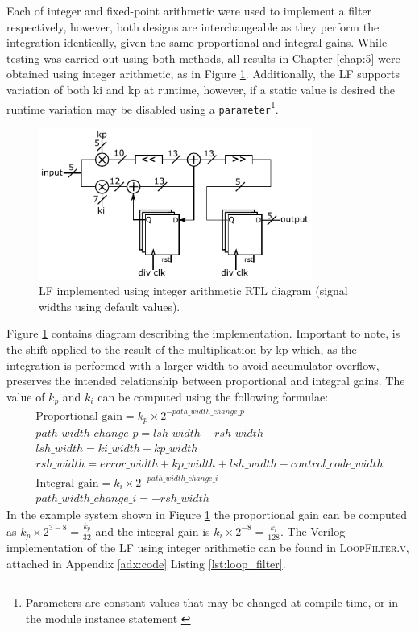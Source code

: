 Each of integer and fixed-point arithmetic were used to implement a filter respectively, however, both designs are interchangeable as they perform the integration identically, given the same proportional and integral gains. While testing was carried out using both methods, all results in Chapter \ref{chap:5} were obtained using integer arithmetic, as in Figure \ref{fig:integer_lf}. Additionally, the \ac{LF} supports variation of both \acs{ki} and \acs{kp} at runtime, however, if a static value is desired the runtime variation may be disabled using a \texttt{parameter}\footnote{Parameters are constant values that may be changed at compile time, or in the module instance statement \cite{hdlworks2}}.
\begin{figure}[h]%
    \centering
    \includegraphics[width=0.8\textwidth]{../integer_lf} 
    \caption[\acl{LF} implemented using integer arithmetic \ac{RTL} diagram]{\acl{LF} implemented using integer arithmetic \ac{RTL} diagram (signal widths using default values).}
    \label{fig:integer_lf}
\end{figure}

Figure \ref{fig:integer_lf} contains  diagram describing the implementation. Important to note, is the shift applied to the result of the multiplication by \acs{kp} which, as the integration is performed with a larger width to avoid accumulator overflow, preserves the intended relationship between proportional and integral gains. The value of $k_p$ and $k_i$ can be computed using the following formulae:
\begin{gather}
\text{Proportional gain} = k_p\times 2^{-path\_width\_change\_p} \\
path\_width\_change\_p = lsh\_width - rsh\_width \\
lsh\_width = ki\_width - kp\_width  \\
rsh\_width = error\_width + kp\_width + lsh\_width - control\_code\_width \\
\text{Integral gain} = k_i\times 2^{-path\_width\_change\_i} \\
path\_width\_change\_i = - rsh\_width
\end{gather}
In the example system shown in Figure \ref{fig:integer_lf} the proportional gain can be computed as $k_p\times 2^{3-8} = \frac{k_p}{32}$ and the integral gain is $k_i\times 2^{-8} = \frac{k_i}{128}$.
The Verilog implementation of the \ac{LF} using integer arithmetic can be found in \textsc{LoopFilter.v}, attached in Appendix \ref{adx:code} Listing \ref{lst:loop_filter}.

